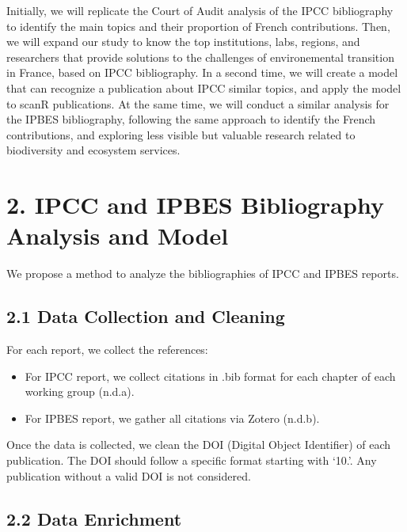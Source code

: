 \documentclass[
]{article}
\providecommand{\tightlist}{%
  \setlength{\itemsep}{0pt}\setlength{\parskip}{0pt}}
\begin{document}
Initially, we will replicate the Court of Audit analysis of the IPCC
bibliography to identify the main topics and their proportion of French
contributions. Then, we will expand our study to know the top
institutions, labs, regions, and researchers that provide solutions to
the challenges of environemental transition in France, based on IPCC
bibliography. In a second time, we will create a model that can
recognize a publication about IPCC similar topics, and apply the model
to scanR publications. At the same time, we will conduct a similar
analysis for the IPBES bibliography, following the same approach to
identify the French contributions, and exploring less visible but
valuable research related to biodiversity and ecosystem services.

\hypertarget{ipcc-and-ipbes-bibliography-analysis-and-model}{%
\section{2. IPCC and IPBES Bibliography Analysis and
Model}\label{ipcc-and-ipbes-bibliography-analysis-and-model}}

We propose a method to analyze the bibliographies of IPCC and IPBES
reports.

\hypertarget{data-collection-and-cleaning}{%
\subsection{2.1 Data Collection and
Cleaning}\label{data-collection-and-cleaning}}

For each report, we collect the references:

\begin{itemize}
\tightlist
\item
  For IPCC report, we collect citations in .bib format for each chapter
  of each working group (n.d.a).
\item
  For IPBES report, we gather all citations via Zotero (n.d.b).
\end{itemize}

Once the data is collected, we clean the DOI (Digital Object Identifier)
of each publication. The DOI should follow a specific format starting
with `10.'. Any publication without a valid DOI is not considered.

\hypertarget{data-enrichment}{%
\subsection{2.2 Data Enrichment}\label{data-enrichment}}
\end{document}
